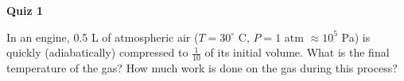 \documentclass{article}
\begin{document}
\fancyfoot[C]{\thepage}
\vspace*{0cm}
\begin{center}
	{\LARGE \textbf{Quiz 1}}\\
	\vspace{.25cm}
\end{center}
In an engine, 0.5 L of atmospheric air ($T=30^\circ$ C, $P=1$ atm $\approx 10^5$ Pa) is quickly (adiabatically) compressed to $\frac{1}{10}$ of its initial volume. What is the final temperature of the gas? How much work is done on the gas during this process?
\end{document}
